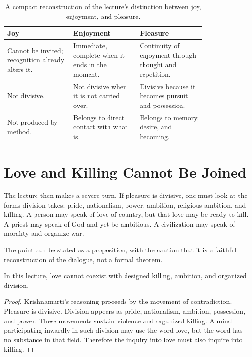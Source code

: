 \begin{table}
\centering
\begin{tabular}{|p{0.27\linewidth}|p{0.27\linewidth}|p{0.27\linewidth}|}
\hline
\textbf{Joy} & \textbf{Enjoyment} & \textbf{Pleasure} \\
\hline
Cannot be invited; recognition already alters it. & Immediate, complete when it ends in the moment. & Continuity of enjoyment through thought and repetition. \\
\hline
Not divisive. & Not divisive when it is not carried over. & Divisive because it becomes pursuit and possession. \\
\hline
Not produced by method. & Belongs to direct contact with what is. & Belongs to memory, desire, and becoming. \\
\hline
\end{tabular}
\caption{A compact reconstruction of the lecture's distinction between joy, enjoyment, and pleasure.}
\end{table}

\section{Love and Killing Cannot Be Joined}

The lecture then makes a severe turn. If pleasure is divisive, one must look at the forms division takes: pride, nationalism, power, ambition, religious ambition, and killing. A person may speak of love of country, but that love may be ready to kill. A priest may speak of God and yet be ambitious. A civilization may speak of morality and organize war.

The point can be stated as a proposition, with the caution that it is a faithful reconstruction of the dialogue, not a formal theorem.

\begin{proposition}
In this lecture, love cannot coexist with designed killing, ambition, and organized division.
\end{proposition}

\begin{proof}
Krishnamurti's reasoning proceeds by the movement of contradiction. Pleasure is divisive. Division appears as pride, nationalism, ambition, possession, and power. These movements sustain violence and organized killing. A mind participating inwardly in such division may use the word love, but the word has no substance in that field. Therefore the inquiry into love must also inquire into killing.
\end{proof}

